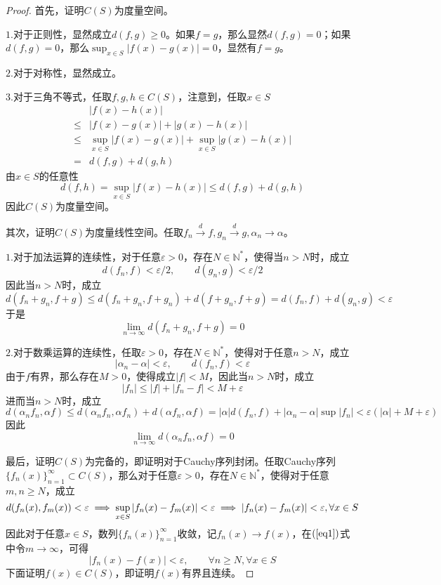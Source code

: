 \documentclass[lang = cn, scheme = chinese, 10pt]{elegantbook}
\newcommand{\N}{\mathbb{N}}  %
\newcommand{\sub}{\subset}   %
\begin{document}
\begin{proof}
	首先，证明$C(S)$为度量空间。
	
	$1.$对于正则性，显然成立$d(f,g)\ge 0$。如果$f=g$，那么显然$d(f,g)=0$；如果$d(f,g)=0$，那么$\sup_{x\in S}|f(x)-g(x)|=0$，显然有$f=g$。
	
	$2.$对于对称性，显然成立。
	
	$3.$对于三角不等式，任取$f,g,h\in C(S)$，注意到，任取$x\in S$
	\nonumber\begin{align}
		&|f(x)-h(x)|\\
		\le&|f(x)-g(x)|+|g(x)-h(x)|\\
		\le&\sup_{x\in S}|f(x)-g(x)|+\sup_{x\in S}|g(x)-h(x)|\\
		=&d(f,g)+d(g,h)
	\end{align}
	由$x\in S$的任意性
	$$
	d(f,h)=\sup_{x\in S}|f(x)-h(x)|\le d(f,g)+d(g,h)
	$$
	因此$C(S)$为度量空间。
	
	其次，证明$C(S)$为度量线性空间。任取$f_n\xrightarrow{d}f,g_n\xrightarrow{d}g,\alpha_n\to\alpha$。
	
	$1.$对于加法运算的连续性，对于任意$\varepsilon>0$，存在$N\in\N^*$，使得当$n>N$时，成立
	$$
	d(f_n,f)<\varepsilon/2,\qquad 
	d(g_n,g)<\varepsilon/2
	$$
	因此当$n>N$时，成立
	$$
	d(f_n+g_n,f+g)\le d(f_n+g_n,f+g_n)+d(f+g_n,f+g)=d(f_n,f)+d(g_n,g)<\varepsilon
	$$
	于是
	$$
	\lim_{n\to\infty}d(f_n+g_n,f+g)=0
	$$
	
	$2.$对于数乘运算的连续性，任取$\varepsilon>0$，存在$N\in\N^*$，使得对于任意$n>N$，成立
	$$
	|\alpha_n-\alpha|<\varepsilon,\qquad 
	d(f_n,f)<\varepsilon
	$$
	由于$f$有界，那么存在$M>0$，使得成立$|f|<M$，因此当$n>N$时，成立
	$$
	|f_n|\le|f|+|f_n-f|<M+\varepsilon
	$$
	进而当$n>N$时，成立
	$$
	d(\alpha_n f_n,\alpha f)\le d(\alpha_nf_n,\alpha f_n)+d(\alpha f_n,\alpha f)=|\alpha|d(f_n,f)+|\alpha_n-\alpha|\sup|f_n|<\varepsilon(|\alpha|+M+\varepsilon)
	$$
	因此
	$$
	\lim_{n\to\infty}d(\alpha_n f_n,\alpha f)=0
	$$
	
	最后，证明$C(S)$为完备的，即证明对于Cauchy序列封闭。任取Cauchy序列$\{f_n(x)\}_{n=1}^{\infty}\sub C(S)$，那么对于任意$\varepsilon>0$，存在$N\in\N^*$，使得对于任意$m,n\ge N$，成立
	\begin{equation}\label{eq1}
		\small{d(f_n(x),f_m(x))<\varepsilon\implies \sup_{x\in S}|f_n(x)-f_m(x)|<\varepsilon\implies 
			|f_n(x)-f_m(x)|<\varepsilon,\forall x\in S}
	\end{equation}
	因此对于任意$x\in S$，数列$\{f_n(x)\}_{n=1}^{\infty}$收敛，记$f_n(x)\to f(x)$，在$(\ref{eq1})$式中令$m\to\infty$，可得
	\begin{equation}\label{eq2}
		|f_n(x)-f(x)|<\varepsilon,\qquad \forall n\ge N,\forall x\in S
	\end{equation}
	下面证明$f(x)\in C(S)$，即证明$f(x)$有界且连续。
	

\end{proof}
\end{document}
